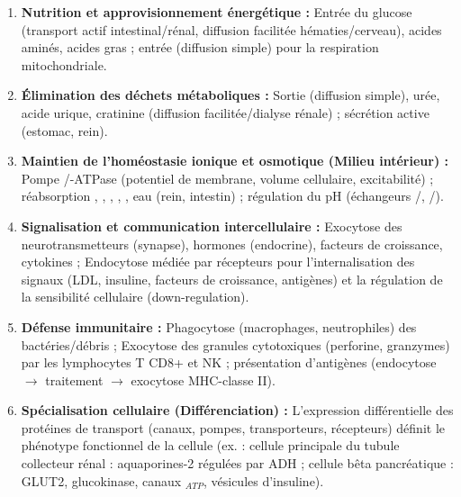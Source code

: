 \documentclass[11pt]{article}
\newcommand{\cle}[1]{{\popxbold\color{popdark}#1}}
\begin{document}
\begin{aretenir}
\begin{enumerate}
\item \textbf{Nutrition et approvisionnement énergétique :} Entrée du glucose (transport actif intestinal/rénal, diffusion facilitée hématies/cerveau), acides aminés, acides gras ; entrée  (diffusion simple) pour la respiration mitochondriale.
\item \textbf{Élimination des déchets métaboliques :} Sortie  (diffusion simple), urée, acide urique, cratinine (diffusion facilitée/dialyse rénale) ; sécrétion active  (estomac, rein).
\item \textbf{Maintien de l'homéostasie ionique et osmotique (Milieu intérieur) :} Pompe /-ATPase (potentiel de membrane, volume cellulaire, excitabilité) ; réabsorption , , , , , eau (rein, intestin) ; régulation du pH (échangeurs /, /).
\item \textbf{Signalisation et communication intercellulaire :} \cle{Exocytose} des neurotransmetteurs (synapse), hormones (endocrine), facteurs de croissance, cytokines ; \cle{Endocytose médiée par récepteurs} pour l'internalisation des signaux (LDL, insuline, facteurs de croissance, antigènes) et la régulation de la sensibilité cellulaire (down-regulation).
\item \textbf{Défense immunitaire :} \cle{Phagocytose} (macrophages, neutrophiles) des bactéries/débris ; \cle{Exocytose} des granules cytotoxiques (perforine, granzymes) par les lymphocytes T CD8+ et NK ; présentation d'antigènes (endocytose $\to$ traitement $\to$ exocytose MHC-classe II).
\item \textbf{Spécialisation cellulaire (Différenciation) :} L'expression différentielle des protéines de transport (canaux, pompes, transporteurs, récepteurs) définit le phénotype fonctionnel de la cellule (ex. : cellule principale du tubule collecteur rénal : aquaporines-2 régulées par ADH ; cellule bêta pancréatique : GLUT2, glucokinase, canaux $_{ATP}$, vésicules d'insuline).
\end{enumerate}
\end{aretenir}
\end{document}
